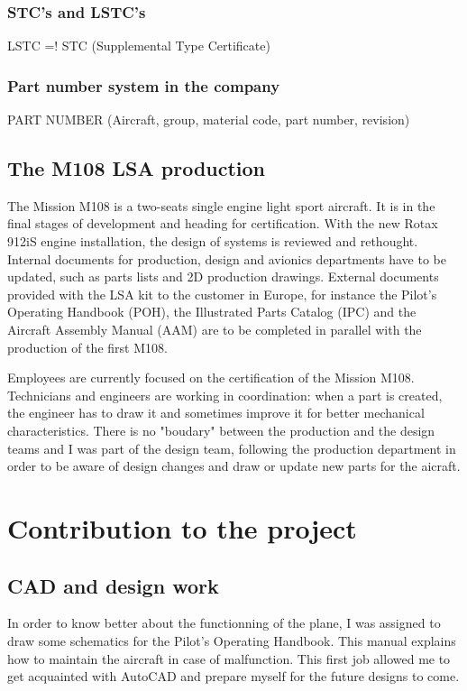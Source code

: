 \documentclass[11pt,a4paper]{report}
\begin{document}
\subsubsection{STC's and LSTC's}
LSTC =! STC (Supplemental Type Certificate)

\subsubsection{Part number system in the company} %
PART NUMBER (Aircraft, group, material code, part number, revision)


\subsection{The M108 LSA production}
The Mission M108 is a two-seats single engine light sport aircraft. It is in the final stages of development and heading for certification. With the new Rotax 912iS engine installation, the design of systems is reviewed and rethought. Internal documents for production, design and avionics departments have to be updated, such as parts lists and 2D production drawings. External documents provided with the LSA kit to the customer in Europe, for instance the Pilot's Operating Handbook (POH), the Illustrated Parts Catalog (IPC) and the Aircraft Assembly Manual (AAM) are to be completed in parallel with the production of the first M108.

\bigskip

Employees are currently focused on the certification of the Mission M108. Technicians and engineers are working in coordination: when a part is created, the engineer has to draw it and sometimes improve it for better mechanical characteristics. There is no "boudary" between the production and the design teams and I was part of the design team, following the production department in order to be aware of design changes and draw or update new parts for the aicraft.

\newpage

\section{Contribution to the project}
\subsection{CAD and design work}

In order to know better about the functionning of the plane, I was assigned to draw some schematics for the Pilot's Operating Handbook. This manual explains how to maintain the aircraft in case of malfunction. This first job allowed me to get acquainted with AutoCAD and prepare myself for the future designs to come. 
\end{document}

